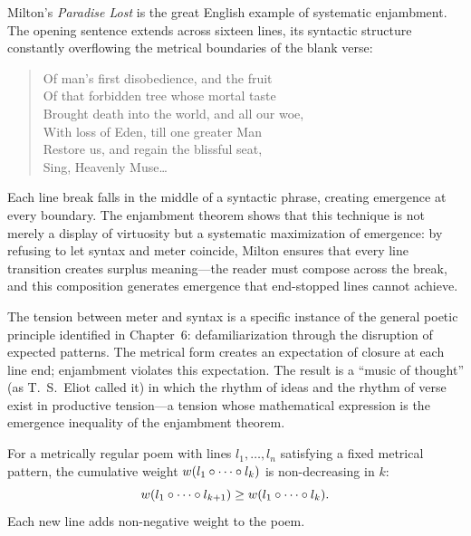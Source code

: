 \begin{interpretation}
\label{interp:milton-enjambment}
Milton's \textit{Paradise Lost} is the great English example of systematic enjambment.  The opening sentence extends across sixteen lines, its syntactic structure constantly overflowing the metrical boundaries of the blank verse:

\begin{quote}
Of man's first disobedience, and the fruit \\
Of that forbidden tree whose mortal taste \\
Brought death into the world, and all our woe, \\
With loss of Eden, till one greater Man \\
Restore us, and regain the blissful seat, \\
Sing, Heavenly Muse\ldots
\end{quote}

Each line break falls in the middle of a syntactic phrase, creating emergence at every boundary.  The enjambment theorem shows that this technique is not merely a display of virtuosity but a systematic maximization of emergence: by refusing to let syntax and meter coincide, Milton ensures that every line transition creates surplus meaning---the reader must compose across the break, and this composition generates emergence that end-stopped lines cannot achieve.

The tension between meter and syntax is a specific instance of the general poetic principle identified in Chapter~6: defamiliarization through the disruption of expected patterns.  The metrical form creates an expectation of closure at each line end; enjambment violates this expectation.  The result is a ``music of thought'' (as T.~S.~Eliot called it) in which the rhythm of ideas and the rhythm of verse exist in productive tension---a tension whose mathematical expression is the emergence inequality of the enjambment theorem.
\end{interpretation}

\begin{theorem}
\label{thm:meter-weight-mono}
For a metrically regular poem with lines $l_1, \ldots, l_n$ satisfying a fixed metrical pattern, the cumulative weight $w(l_1 \circ \cdots \circ l_k)$ is non-decreasing in $k$:
\[
  w(l_1 \circ \cdots \circ l_{k+1}) \geq w(l_1 \circ \cdots \circ l_k).
\]
Each new line adds non-negative weight to the poem.
\end{theorem}

